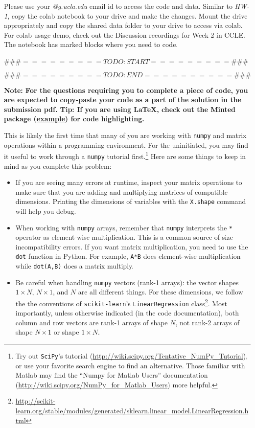 \documentclass[11pt]{article}
\begin{document}
Please use your \textit{@g.ucla.edu} email id to access the code and data. Similar to \textit{HW-1}, copy the colab notebook to your drive and make the changes. Mount the drive appropriately and copy the shared data folder to your drive to access via colab. For colab usage demo, check out the Discussion recordings for Week 2 in CCLE. 
The notebook has marked blocks where you need to code. \\
\\
 $\#\#\# ========= TODO  : START ========= \#\#\#$
 
 $\#\#\# ========= TODO :  END   ========== \#\#\#$

\textbf{Note: For the questions requiring you to complete a piece of code, you are expected to copy-paste your code as a part of the solution in the submission pdf. Tip: If you are using \LaTeX, check out the Minted package (\href{https://www.overleaf.com/learn/latex/Code_Highlighting_with_minted}{example}) for code highlighting.} 

This is likely the first time that many of you are working with \verb|numpy| and matrix operations within a programming environment. For the uninitiated, you may find it useful to work through a \verb|numpy| tutorial first.\footnote{Try out \verb~SciPy~'s tutorial (\url{http://wiki.scipy.org/Tentative_NumPy_Tutorial}), or use your favorite search engine to find an alternative. Those familiar with Matlab may find the ``Numpy for Matlab Users'' documentation (\url{http://wiki.scipy.org/NumPy_for_Matlab_Users}) more helpful.} Here are some things to keep in mind as you complete this problem:
\begin{itemize}[nosep]
\item If you are seeing many errors at runtime, inspect your matrix operations to make sure that you are adding and multiplying matrices of compatible dimensions. Printing the dimensions of variables with the \verb|X.shape| command will help you debug.
\item When working with \verb|numpy| arrays, remember that \verb|numpy| interprets the \verb|*| operator as element-wise multiplication. This is a common source of size incompatibility errors. If you want matrix multiplication, you need to use the \verb|dot| function in Python. For example, \verb|A*B| does element-wise multiplication while \verb|dot(A,B)| does a matrix multiply.
\item Be careful when handling \verb|numpy| vectors (rank-1 arrays): the vector shapes $1 \times N$, $N \times 1$, and $N$ are all different things. For these dimensions, we follow the the conventions of \verb|scikit-learn|'s \verb|LinearRegression| class\footnote{\url{http://scikit-learn.org/stable/modules/generated/sklearn.linear_model.LinearRegression.html}}. Most importantly, unless otherwise indicated (in the code documentation), both column and row vectors are rank-1 arrays of shape $N$, not rank-2 arrays of shape $N \times 1$ or shape $1 \times N$.
\end{itemize}
\end{document}
